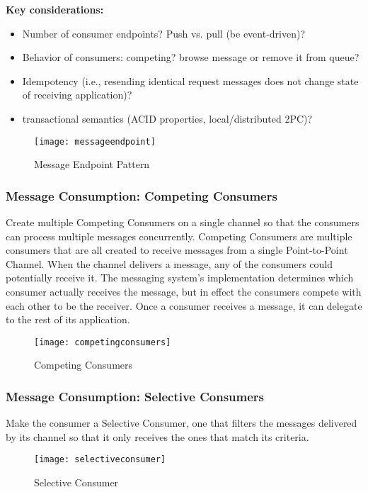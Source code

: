 \textbf{Key considerations:}
\begin{itemize}
  \item Number of consumer endpoints? Push vs. pull (be event-driven)?
  \item Behavior of consumers: competing? browse message or remove it from queue?
  \item Idempotency (i.e., resending identical request messages does not change state of receiving application)?
  \item transactional semantics (ACID properties, local/distributed 2PC)?
\end{itemize}

\begin{figure}[H]
  \center
  \texttt{[image: messageendpoint]}
  \caption{Message Endpoint Pattern}
\end{figure}

\subsubsection{Message Consumption: Competing Consumers}
Create multiple Competing Consumers on a single channel so that the consumers can process multiple messages concurrently. Competing Consumers are multiple consumers that are all created to receive messages from a single Point-to-Point Channel. When the channel delivers a message, any of the consumers could potentially receive it. The messaging system's implementation determines which consumer actually receives the message, but in effect the consumers compete with each other to be the receiver. Once a consumer receives a message, it can delegate to the rest of its application.

\begin{figure}[H]
  \center
  \texttt{[image: competingconsumers]}
  \caption{Competing Consumers}
\end{figure}

\subsubsection{Message Consumption: Selective Consumers}
Make the consumer a Selective Consumer, one that filters the messages delivered by its channel so that it only receives the ones that match its criteria.

\begin{figure}[H]
  \center
  \texttt{[image: selectiveconsumer]}
  \caption{Selective Consumer}
\end{figure}


